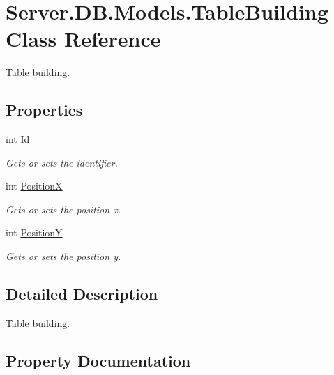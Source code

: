 \hypertarget{classServer_1_1DB_1_1Models_1_1TableBuilding}{}\section{Server.\+D\+B.\+Models.\+Table\+Building Class Reference}
\label{classServer_1_1DB_1_1Models_1_1TableBuilding}


Table building.  


\subsection*{Properties}
\begin{DoxyCompactItemize}
\item 
int \hyperlink{classServer_1_1DB_1_1Models_1_1TableBuilding_a9d598f41ae682a64c7c9cd05e5fcfd97}{Id}
\begin{DoxyCompactList}\small\item\em Gets or sets the identifier. \end{DoxyCompactList}\item 
int \hyperlink{classServer_1_1DB_1_1Models_1_1TableBuilding_a51f82ae3d59ec5972f1203df61f835b7}{Position\+X}
\begin{DoxyCompactList}\small\item\em Gets or sets the position x. \end{DoxyCompactList}\item 
int \hyperlink{classServer_1_1DB_1_1Models_1_1TableBuilding_ac12da5d0fc35d3fd054286c48e8e34d6}{Position\+Y}
\begin{DoxyCompactList}\small\item\em Gets or sets the position y. \end{DoxyCompactList}\end{DoxyCompactItemize}


\subsection{Detailed Description}
Table building. 



\subsection{Property Documentation}
\hypertarget{classServer_1_1DB_1_1Models_1_1TableBuilding_a9d598f41ae682a64c7c9cd05e5fcfd97}{}
